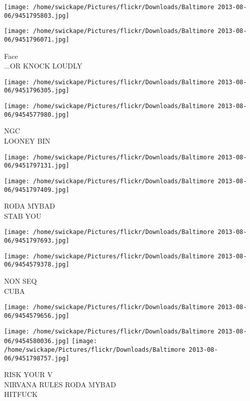 \documentclass[10pt,letterpaper]{article}
\begin{document}
\texttt{[image: /home/swickape/Pictures/flickr/Downloads/Baltimore 2013-08-06/9451795803.jpg]}

\vspace{0.25in}
\texttt{[image: /home/swickape/Pictures/flickr/Downloads/Baltimore 2013-08-06/9451796071.jpg]}

Face\\
...OR KNOCK LOUDLY\\
\pagebreak

\texttt{[image: /home/swickape/Pictures/flickr/Downloads/Baltimore 2013-08-06/9451796305.jpg]}

\vspace{0.25in}
\texttt{[image: /home/swickape/Pictures/flickr/Downloads/Baltimore 2013-08-06/9454577980.jpg]}

NGC\\
LOONEY BIN\\
\pagebreak

\texttt{[image: /home/swickape/Pictures/flickr/Downloads/Baltimore 2013-08-06/9451797131.jpg]}

\vspace{0.25in}
\texttt{[image: /home/swickape/Pictures/flickr/Downloads/Baltimore 2013-08-06/9451797409.jpg]}

RODA MYBAD\\
STAB YOU\\
\pagebreak

\texttt{[image: /home/swickape/Pictures/flickr/Downloads/Baltimore 2013-08-06/9451797693.jpg]}

\vspace{0.25in}
\texttt{[image: /home/swickape/Pictures/flickr/Downloads/Baltimore 2013-08-06/9454579378.jpg]}

NON SEQ\\
CUBA\\
\pagebreak

\texttt{[image: /home/swickape/Pictures/flickr/Downloads/Baltimore 2013-08-06/9454579656.jpg]}

\vspace{0.25in}
\texttt{[image: /home/swickape/Pictures/flickr/Downloads/Baltimore 2013-08-06/9454580036.jpg]}
\texttt{[image: /home/swickape/Pictures/flickr/Downloads/Baltimore 2013-08-06/9451798757.jpg]}

RISK YOUR V\\
NIRVANA RULES RODA MYBAD\\
HITFUCK\\
\pagebreak
\end{document}
